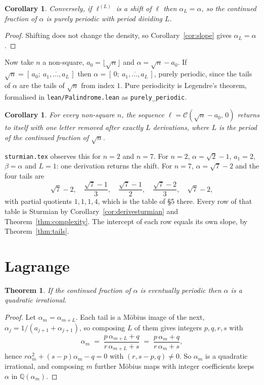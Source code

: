 \documentclass[11pt,a4paper]{article}
\newcommand{\C}{\mathcal{C}}
\theoremstyle{definition}
\theoremstyle{plain}
\newtheorem{theorem}[definition]{Theorem}
\newtheorem{corollary}[definition]{Corollary}
\begin{document}
\begin{corollary}\label{cor:cycleconv}
Conversely, if $\ell^{(L)}$ is a shift of $\ell$ then $\alpha_L = \alpha$, so
the continued fraction of $\alpha$ is purely periodic with period dividing $L$.
\end{corollary}

\begin{proof}
Shifting does not change the density, so Corollary~\ref{cor:slope} gives
$\alpha_L = \alpha$.
\end{proof}

Now take $n$ a non-square, $a_0 = \lfloor \sqrt n\rfloor$ and
$\alpha = \sqrt n - a_0$. If $\sqrt n = [\,a_0;\ \overline{a_1,\ldots,a_L}\,]$
then $\alpha = [\,0;\ \overline{a_1,\ldots,a_L}\,]$, purely periodic, since the
tails of $\alpha$ are the tails of $\sqrt n$ from index $1$. Pure periodicity is
Legendre's theorem, formalised in \texttt{lean/Palindrome.lean} as
\texttt{purely\_periodic}.

\begin{corollary}
For every non-square $n$, the sequence $\ell = \C(\sqrt n - a_0,\, 0)$ returns
to itself with one letter removed after exactly $L$ derivations, where $L$ is
the period of the continued fraction of $\sqrt n$.
\end{corollary}

\texttt{sturmian.tex} observes this for $n = 2$ and $n = 7$. For $n = 2$,
$\alpha = \sqrt 2 - 1$, $a_1 = 2$, $\beta = \alpha$ and $L = 1$: one derivation
returns the shift. For $n = 7$, $\alpha = \sqrt 7 - 2$ and the four tails are
\[
  \sqrt 7 - 2, \quad \frac{\sqrt 7 - 1}{3}, \quad \frac{\sqrt 7 - 1}{2},
  \quad \frac{\sqrt 7 - 2}{3}, \quad \sqrt 7 - 2 ,
\]
with partial quotients $1, 1, 1, 4$, which is the table of \S5 there. Every row
of that table is Sturmian by Corollary~\ref{cor:derivesturmian} and
Theorem~\ref{thm:complexity}. The intercept of each row equals its own slope,
by Theorem~\ref{thm:tails}.

\section{Lagrange}

\begin{theorem}
If the continued fraction of $\alpha$ is eventually periodic then $\alpha$ is a
quadratic irrational.
\end{theorem}

\begin{proof}
Let $\alpha_m = \alpha_{m+L}$. Each tail is a M\"obius image of the next,
$\alpha_j = 1/(a_{j+1} + \alpha_{j+1})$, so composing $L$ of them gives
integers $p,q,r,s$ with
\[
  \alpha_m \;=\; \frac{p\,\alpha_{m+L} + q}{r\,\alpha_{m+L} + s}
  \;=\; \frac{p\,\alpha_m + q}{r\,\alpha_m + s} ,
\]
hence $r\alpha_m^2 + (s-p)\alpha_m - q = 0$ with $(r,s-p,q) \neq 0$. So
$\alpha_m$ is a quadratic irrational, and composing $m$ further M\"obius maps
with integer coefficients keeps $\alpha$ in $\mathbb{Q}(\alpha_m)$.
\end{proof}
\end{document}
